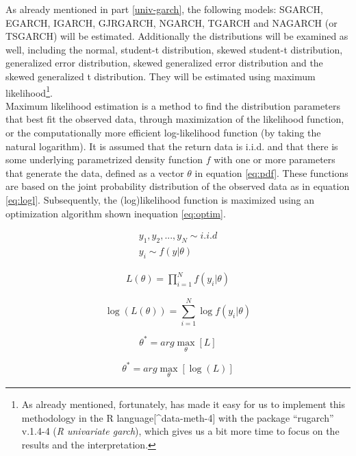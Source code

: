 \documentclass[a4paper, twoside]{templates/ociamthesis}
\begin{document}
\noindent As already mentioned in part \ref{univ-garch}, the following models: SGARCH, EGARCH, IGARCH, GJRGARCH, NGARCH, TGARCH and NAGARCH (or TSGARCH) will be estimated. Additionally the distributions will be examined as well, including the normal, student-t distribution, skewed student-t distribution, generalized error distribution, skewed generalized error distribution and the skewed generalized t distribution. They will be estimated using maximum likelihood\footnote{As already mentioned, fortunately, \textcite{alexios2020} has made it easy for us to implement this methodology in the R language{[}\^{}data-meth-4{]} \autocite{Rteam} with the package ``rugarch'' v.1.4-4 (\emph{R univariate garch}), which gives us a bit more time to focus on the results and the interpretation.}.~\\

\noindent Maximum likelihood estimation is a method to find the distribution parameters that best fit the observed data, through maximization of the likelihood function, or the computationally more efficient log-likelihood function (by taking the natural logarithm). It is assumed that the return data is i.i.d. and that there is some underlying parametrized density function \(f\) with one or more parameters that generate the data, defined as a vector \(\theta\) in equation \eqref{eq:pdf}. These functions are based on the joint probability distribution of the observed data as in equation \eqref{eq:logl}. Subsequently, the (log)likelihood function is maximized using an optimization algorithm shown inequation \eqref{eq:optim}.

\begin{align} 
  y_1,y_2,...,y_N \sim i.i.d
    \\
  y_i \sim f(y|\theta)
 \label{eq:pdf}
\end{align}

\begin{align} 
 L(\theta) = \prod^N_{i=1}f(y_i|\theta)
 \label{eq:logl}
\end{align}

\[\log(L(\theta)) = \sum^N_{i=1} \log f(y_i |\theta)\]

\begin{equation} 
\theta^{*} = arg \max_{\theta} [ L] 
 \label{eq:optim}
\end{equation}

\begin{equation} 
\theta^{*} = arg \max_{\theta} [\log(L)]
\end{equation}
\end{document}

